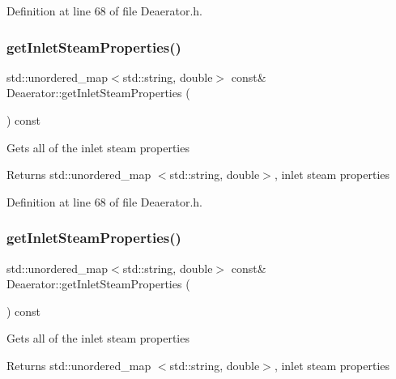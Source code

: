 Definition at line 68 of file Deaerator.\+h.

\mbox{\label{class_deaerator_ae777da23f2504f8724850946378b3cf5}} 
\subsubsection{\texorpdfstring{get\+Inlet\+Steam\+Properties()}{getInletSteamProperties()}\hspace{0.1cm}{\footnotesize\ttfamily [2/3]}}
{\footnotesize\ttfamily std\+::unordered\+\_\+map$<$std\+::string, double$>$ const\& Deaerator\+::get\+Inlet\+Steam\+Properties (\begin{DoxyParamCaption}{ }\end{DoxyParamCaption}) const\hspace{0.3cm}{\ttfamily [inline]}}

Gets all of the inlet steam properties \begin{DoxyReturn}{Returns}
std\+::unordered\+\_\+map $<$std\+::string, double$>$, inlet steam properties 
\end{DoxyReturn}


Definition at line 68 of file Deaerator.\+h.

\mbox{\label{class_deaerator_ae777da23f2504f8724850946378b3cf5}} 
\subsubsection{\texorpdfstring{get\+Inlet\+Steam\+Properties()}{getInletSteamProperties()}\hspace{0.1cm}{\footnotesize\ttfamily [3/3]}}
{\footnotesize\ttfamily std\+::unordered\+\_\+map$<$std\+::string, double$>$ const\& Deaerator\+::get\+Inlet\+Steam\+Properties (\begin{DoxyParamCaption}{ }\end{DoxyParamCaption}) const\hspace{0.3cm}{\ttfamily [inline]}}

Gets all of the inlet steam properties \begin{DoxyReturn}{Returns}
std\+::unordered\+\_\+map $<$std\+::string, double$>$, inlet steam properties 
\end{DoxyReturn}


